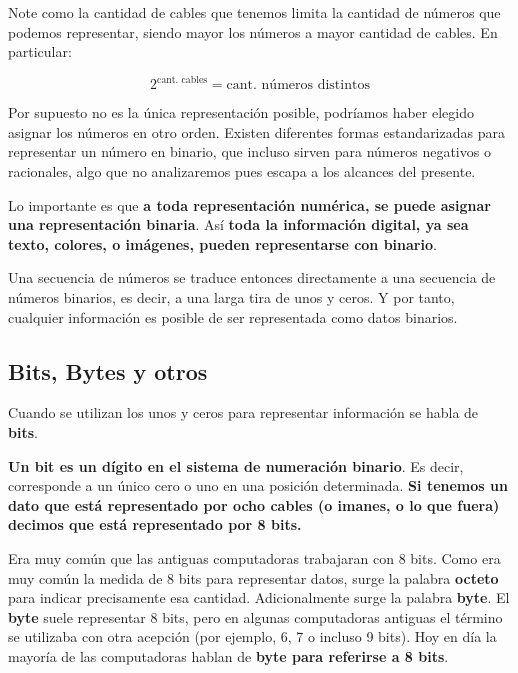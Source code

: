 Note como la cantidad de cables que tenemos limita la cantidad de números que
podemos representar, siendo mayor los números a mayor cantidad de cables. En
particular:

\begin{equation}
    2^{\text{cant. cables}} = \text{cant. números distintos}
\end{equation}

Por supuesto no es la única representación posible, podríamos haber elegido
asignar los números en otro orden. Existen diferentes formas estandarizadas para
representar un número en binario, que incluso sirven para números negativos o
racionales, algo que no analizaremos pues escapa a los alcances del presente.

Lo importante es que \textbf{a toda representación numérica, se puede asignar
una representación binaria}. Así \textbf{toda la información digital, ya sea
texto, colores, o imágenes, pueden representarse con binario}.\autocite[p.
17]{white_2015}

Una secuencia de números se traduce entonces directamente a una secuencia de
números binarios, es decir, a una larga tira de unos y ceros. Y por tanto,
cualquier información es posible de ser representada como datos binarios.

\subsection{Bits, Bytes y otros}
\label{chap:bajo_nivel:subsec:bits}

Cuando se utilizan los unos y ceros para representar información se habla de
\textbf{bits}.

\textbf{Un bit es un dígito en el sistema de numeración binario}. Es decir,
corresponde a un único cero o uno en una posición determinada. \textbf{Si
tenemos un dato que está representado por ocho cables (o imanes, o lo que fuera)
decimos que está representado por 8 bits.}

Era muy común que las antiguas computadoras trabajaran con 8 bits. Como era muy
común la medida de 8 bits para representar datos, surge la palabra
\textbf{octeto} para indicar precisamente esa cantidad. Adicionalmente surge la
palabra \textbf{byte}. El \textbf{byte} suele representar 8 bits, pero en
algunas computadoras antiguas el término se utilizaba con otra acepción (por
ejemplo, 6, 7 o incluso 9 bits). Hoy en día la mayoría de las computadoras
hablan de \textbf{byte para referirse a 8 bits}.

